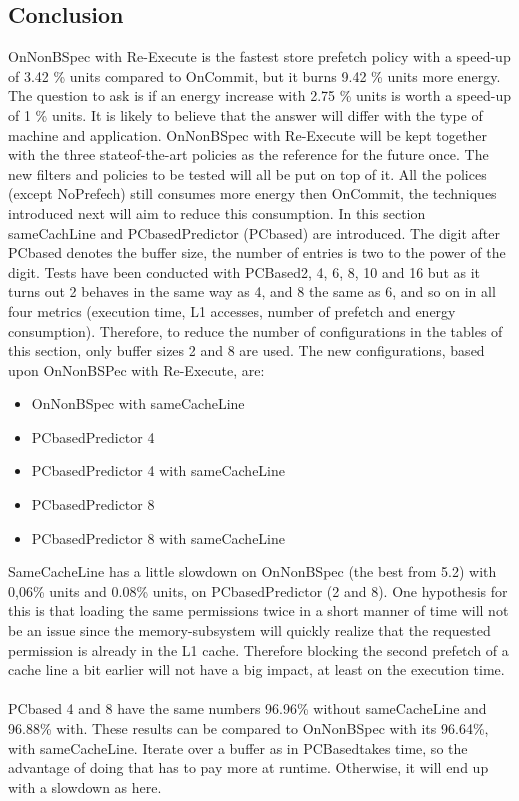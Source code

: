 \subsection{Conclusion}
OnNonBSpec with Re-Execute is the fastest store prefetch policy with a speed-up of 3.42 \% units compared to OnCommit, but it burns 9.42 \% units more energy. The
question to ask is if an energy increase with 2.75 \% units is worth a speed-up of 1 \%
units. It is likely to believe that the answer will differ with the type of machine and
application. OnNonBSpec with Re-Execute will be kept together with the three stateof-the-art policies as the reference for the future once. The new filters and policies to
be tested will all be put on top of it. All the polices (except NoPrefech) still consumes
more energy then OnCommit, the techniques introduced next will aim to reduce this
consumption.
In this section sameCachLine and PCbasedPredictor (PCbased) are introduced. The  digit after PCbased denotes the buffer size, the number of entries is two to the power
of the digit. Tests have been conducted with PCBased2, 4, 6, 8, 10 and 16 but as it
turns out 2 behaves in the same way as 4, and 8 the same as 6, and so on in all four
metrics (execution time, L1 accesses, number of prefetch and energy consumption).
Therefore, to reduce the number of configurations in the tables of this section, only
buffer sizes 2 and 8 are used. The new configurations, based upon OnNonBSPec with
Re-Execute, are:
\begin{itemize}
    \item OnNonBSpec with sameCacheLine
    \item PCbasedPredictor 4
    \item PCbasedPredictor 4 with sameCacheLine
    \item PCbasedPredictor 8
    \item PCbasedPredictor 8 with sameCacheLine
\end{itemize}
\resExtime
{}
 SameCacheLine has a little slowdown on OnNonBSpec (the best from 5.2) with
0,06\% units and 0.08\% units, on PCbasedPredictor (2 and 8). One hypothesis for this
is that loading the same permissions twice in a short manner of time will not be an
issue since the memory-subsystem will quickly realize that the requested permission
is already in the L1 cache. Therefore blocking the second prefetch of a cache line a
bit earlier will not have a big impact, at least on the execution time.
\\ \\ 
PCbased 4 and 8 have the same numbers 96.96\% without sameCacheLine and 96.88\% with. These results can be compared to OnNonBSpec with its 96.64\%, with sameCacheLine. Iterate over a buffer as in PCBasedtakes time, so the advantage of doing
that has to pay more at runtime. Otherwise, it will end up with a slowdown as here.

